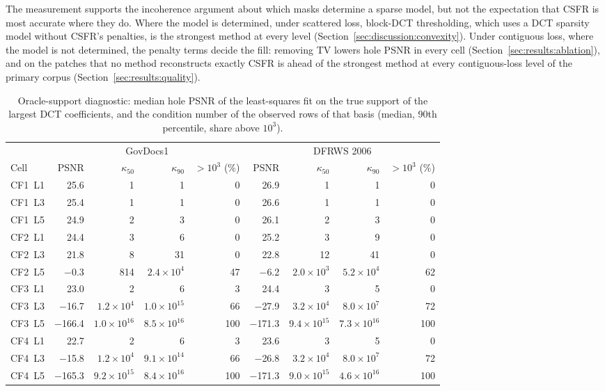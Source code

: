 \documentclass[final,3p]{elsarticle}
\begin{document}
The measurement supports the incoherence argument about which masks determine a sparse model, but not the expectation that CSFR is most accurate where they do. Where the model is determined, under scattered loss, block-DCT thresholding, which uses a DCT sparsity model without CSFR's penalties, is the strongest method at every level (Section~\ref{sec:discussion:convexity}). Under contiguous loss, where the model is not determined, the penalty terms decide the fill: removing TV lowers hole PSNR in every cell (Section~\ref{sec:results:ablation}), and on the patches that no method reconstructs exactly CSFR is ahead of the strongest method at every contiguous-loss level of the primary corpus (Section~\ref{sec:results:quality}).

\begin{table}[!t]
\centering
\caption{Oracle-support diagnostic: median hole PSNR of the least-squares fit on the true support of the largest DCT coefficients, and the condition number of the observed rows of that basis (median, 90th percentile, share above $10^{3}$).}
\label{tab:oracle}
\footnotesize
\begin{tabular}{@{}l*{8}{r}@{}}
\toprule
 & \multicolumn{4}{c}{GovDocs1} & \multicolumn{4}{c}{DFRWS 2006} \\
\cmidrule(lr){2-5}\cmidrule(l){6-9}
Cell & PSNR & $\kappa_{50}$ & $\kappa_{90}$ & $>10^{3}$ (\%) & PSNR & $\kappa_{50}$ & $\kappa_{90}$ & $>10^{3}$ (\%) \\
\midrule
CF1~L1 & 25.6 & 1 & 1 & 0 & 26.9 & 1 & 1 & 0 \\
CF1~L3 & 25.4 & 1 & 1 & 0 & 26.6 & 1 & 1 & 0 \\
CF1~L5 & 24.9 & 2 & 3 & 0 & 26.1 & 2 & 3 & 0 \\
\midrule
CF2~L1 & 24.4 & 3 & 6 & 0 & 25.2 & 3 & 9 & 0 \\
CF2~L3 & 21.8 & 8 & 31 & 0 & 22.8 & 12 & 41 & 0 \\
CF2~L5 & $-$0.3 & 814 & $2.4{\times}10^{4}$ & 47 & $-$6.2 & $2.0{\times}10^{3}$ & $5.2{\times}10^{4}$ & 62 \\
\midrule
CF3~L1 & 23.0 & 2 & 6 & 3 & 24.4 & 3 & 5 & 0 \\
CF3~L3 & $-$16.7 & $1.2{\times}10^{4}$ & $1.0{\times}10^{15}$ & 66 & $-$27.9 & $3.2{\times}10^{4}$ & $8.0{\times}10^{7}$ & 72 \\
CF3~L5 & $-$166.4 & $1.0{\times}10^{16}$ & $8.5{\times}10^{16}$ & 100 & $-$171.3 & $9.4{\times}10^{15}$ & $7.3{\times}10^{16}$ & 100 \\
\midrule
CF4~L1 & 22.7 & 2 & 6 & 3 & 23.6 & 3 & 5 & 0 \\
CF4~L3 & $-$15.8 & $1.2{\times}10^{4}$ & $9.1{\times}10^{14}$ & 66 & $-$26.8 & $3.2{\times}10^{4}$ & $8.0{\times}10^{7}$ & 72 \\
CF4~L5 & $-$165.3 & $9.2{\times}10^{15}$ & $8.4{\times}10^{16}$ & 100 & $-$171.3 & $9.0{\times}10^{15}$ & $4.6{\times}10^{16}$ & 100 \\
\bottomrule
\end{tabular}
\end{table}
\end{document}
